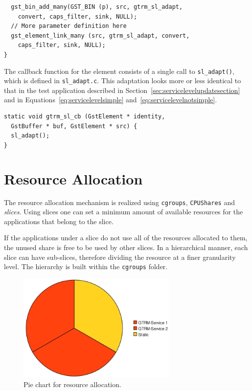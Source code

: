 \documentclass[nobiblatex]{LTHthesis}
\begin{document}
\begin{lstlisting}
  gst_bin_add_many(GST_BIN (p), src, gtrm_sl_adapt, 
    convert, caps_filter, sink, NULL);
  // More parameter definition here
  gst_element_link_many (src, gtrm_sl_adapt, convert, 
    caps_filter, sink, NULL);
}
\end{lstlisting}

The callback function for the element consists of a single call 
to \texttt{sl\_adapt()}, which is defined in \texttt{sl\_adapt.c}. 
This adaptation looks more or less identical to that in the test 
application described in Section~\ref{sec:servicelevelupdatesection} and
in Equations~\eqref{eq:servicelevelsimple} 
and~\eqref{eq:servicelevelnotsimple}.

\begin{lstlisting}
static void gtrm_sl_cb (GstElement * identity, 
  GstBuffer * buf, GstElement * src) {
  sl_adapt();
}
\end{lstlisting}

\section{Resource Allocation}

The resource allocation mechanism is realized using \texttt{cgroups},
\texttt{CPUShares} and \emph{slices}. Using slices one can set a minimum
amount of available resources for the applications that belong to the slice.

If the applications under a slice do not use all of the resources allocated 
to them, the unused share is free to be used by other slices. In a
hierarchical manner, each slice can have sub-slices, therefore dividing the resource at a finer granularity level. The hierarchy is built within the
\texttt{cgroups} folder.

\begin{figure}[t]
  \centering
  \includegraphics[width=0.7\textwidth]{piechart.jpeg}
  \caption{Pie chart for resource allocation.}
  \label{fig:Piechart}
\end{figure}
\end{document}
